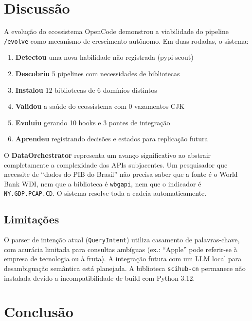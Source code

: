 \documentclass[12pt,a4paper]{article}
\begin{document}
\section{Discussão}

A evolução do ecossistema OpenCode demonstrou a viabilidade do pipeline \texttt{/evolve} como mecanismo de crescimento autônomo. Em duas rodadas, o sistema:

\begin{enumerate}
  \item \textbf{Detectou} uma nova habilidade não registrada (pypi-scout)
  \item \textbf{Descobriu} 5 pipelines com necessidades de bibliotecas
  \item \textbf{Instalou} 12 bibliotecas de 6 domínios distintos
  \item \textbf{Validou} a saúde do ecossistema com 0 vazamentos CJK
  \item \textbf{Evoluiu} gerando 10 hooks e 3 pontes de integração
  \item \textbf{Aprendeu} registrando decisões e estados para replicação futura
\end{enumerate}

O \textbf{DataOrchestrator} representa um avanço significativo ao abstrair completamente a complexidade das APIs subjacentes. Um pesquisador que necessite de ``dados do PIB do Brasil'' não precisa saber que a fonte é o World Bank WDI, nem que a biblioteca é \texttt{wbgapi}, nem que o indicador é \texttt{NY.GDP.PCAP.CD}. O sistema resolve toda a cadeia automaticamente.

\subsection{Limitações}

O parser de intenção atual (\texttt{QueryIntent}) utiliza casamento de palavras-chave, com acurácia limitada para consultas ambíguas (ex.: ``Apple'' pode referir-se à empresa de tecnologia ou à fruta). A integração futura com um LLM local para desambiguação semântica está planejada. A biblioteca \texttt{scihub-cn} permanece não instalada devido a incompatibilidade de build com Python 3.12.

\section{Conclusão}
\end{document}
